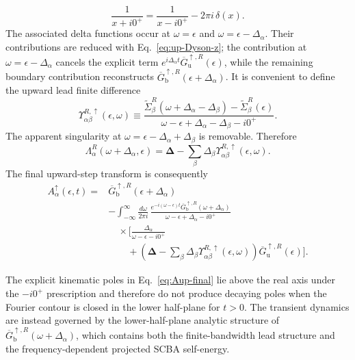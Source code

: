\documentclass[
 reprint,
 superscriptaddress,
 amsmath,amssymb,
 aps,prb,
 longbibliography,
 floatfix
]{revtex4-2}
\begin{document}
\begin{equation*}
\frac{1}{x+i0^+}
=
\frac{1}{x-i0^+}
-2\pi i\,\delta(x).
\end{equation*}
The associated delta functions occur at $\omega=\epsilon$ and $\omega=\epsilon-\Delta_\alpha$. Their contributions are reduced with Eq.~\eqref{eq:up-Dyson-z}; the contribution at $\omega=\epsilon-\Delta_\alpha$ cancels the explicit term $e^{i\Delta_\alpha t}\overline G_{\mathrm u}^{\uparrow,R}(\epsilon)$, while the remaining boundary contribution reconstructs $\overline G_{\mathrm b}^{\uparrow,R}(\epsilon+\Delta_\alpha)$. It is convenient to define the upward lead finite difference
\begin{equation*}
\Upsilon_{\alpha\beta}^{R,\uparrow}(\epsilon,\omega)
\equiv
\frac{
\widetilde\Sigma_\beta^R
(\omega+\Delta_\alpha-\Delta_\beta)
-
\widetilde\Sigma_\beta^R(\epsilon)}
{\omega-\epsilon+\Delta_\alpha-\Delta_\beta-i0^+}.
\end{equation*}
The apparent singularity at $\omega=\epsilon-\Delta_\alpha+\Delta_\beta$ is removable. Therefore
\begin{equation*}
\Lambda_\alpha^R
(\omega+\Delta_\alpha,\epsilon)
=
\bm\Delta
-
\sum_\beta
\Delta_\beta
\Upsilon_{\alpha\beta}^{R,\uparrow}(\epsilon,\omega).
\end{equation*}
The final upward-step transform is consequently
\begin{equation}
\boxed{
\begin{aligned}
A_\alpha^{\uparrow}(\epsilon,t)
={}&
\overline G_{\mathrm b}^{\uparrow,R}
(\epsilon+\Delta_\alpha)
\\
&-
\int_{-\infty}^{\infty}
\frac{d\omega}{2\pi i}\,
\frac{
e^{-i(\omega-\epsilon)t}
\overline G_{\mathrm b}^{\uparrow,R}
(\omega+\Delta_\alpha)}
{\omega-\epsilon+\Delta_\alpha-i0^+}
\\
&\quad\times
\Bigg[
\frac{\Delta_\alpha}
{\omega-\epsilon-i0^+}
\\
&\qquad+
\left(
\bm\Delta
-
\sum_\beta
\Delta_\beta
\Upsilon_{\alpha\beta}^{R,\uparrow}
(\epsilon,\omega)
\right)
\overline G_{\mathrm u}^{\uparrow,R}(\epsilon)
\Bigg].
\end{aligned}}
\label{eq:Aup-final}
\end{equation}

The explicit kinematic poles in Eq.~\eqref{eq:Aup-final} lie above the real axis under the $-i0^+$ prescription and therefore do not produce decaying poles when the Fourier contour is closed in the lower half-plane for $t>0$. The transient dynamics are instead governed by the lower-half-plane analytic structure of $\overline G_{\mathrm b}^{\uparrow,R}(\omega+\Delta_\alpha)$, which contains both the finite-bandwidth lead structure and the frequency-dependent projected SCBA self-energy.
\end{document}
